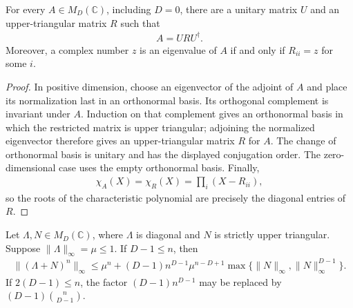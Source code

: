 \begin{theorem}
    \label{thm:unitary_schur_triangularization}
    \leanok
    For every $A\in M_D(\mathbb C)$, including $D=0$, there are a unitary
    matrix $U$ and an upper-triangular matrix $R$ such that
    \begin{align}
      A=URU^\dagger.
    \end{align}
    Moreover, a complex number $z$ is an eigenvalue of $A$ if and only if
    $R_{ii}=z$ for some $i$.
\end{theorem}

\begin{proof}
    \leanok
    In positive dimension, choose an eigenvector of the adjoint of $A$ and
    place its normalization last in an orthonormal basis.  Its orthogonal
    complement is invariant under $A$.  Induction on that complement gives
    an orthonormal basis in which the restricted matrix is upper triangular;
    adjoining the normalized eigenvector therefore gives an upper-triangular
    matrix $R$ for $A$.  The change of orthonormal basis is unitary and has
    the displayed conjugation order.  The zero-dimensional case uses the
    empty orthonormal basis.  Finally,
    \begin{align}
      \chi_A(X)=\chi_R(X)=\prod_i(X-R_{ii}),
    \end{align}
    so the roots of the characteristic polynomial are precisely the diagonal
    entries of $R$.
\end{proof}

\begin{theorem}
    \label{thm:wolf_schur_form_spectral_radius_estimate}
    \leanok
    Let $\Lambda,N\in M_D(\mathbb C)$, where $\Lambda$ is diagonal and $N$ is
    strictly upper triangular.  Suppose
    $\lVert\Lambda\rVert_\infty=\mu\le1$.  If $D-1\le n$, then
    \begin{align}
      \lVert(\Lambda+N)^n\rVert_\infty
      \le \mu^n
      +(D-1)n^{D-1}\mu^{n-D+1}
        \max\{\lVert N\rVert_\infty,\lVert N\rVert_\infty^{D-1}\}.
    \end{align}
    If $2(D-1)\le n$, the factor $(D-1)n^{D-1}$ may be replaced by
    $(D-1)\binom{n}{D-1}$.
\end{theorem}

